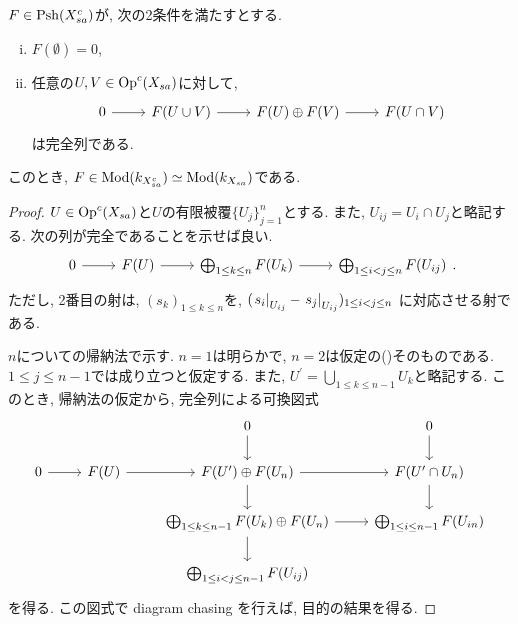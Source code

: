 \documentclass[../main]{subfiles}
\begin{document}
\begin{prop}
  $F\in\mathrm{Psh}(X_{sa}^c)$が, 次の2条件を満たすとする.
  \begin{enumerate}[(i)]
    \item $F(\emptyset)=0$,
    \item 任意の$U,V\in\mathrm{Op}^c(X_{sa})$に対して,
      \[
        \begin{tikzcd}
          0 \ar[r]
          & F(U \cup V) \ar[r]
          & F(U) \oplus F(V) \ar[r]
          & F(U \cap V)
        \end{tikzcd}
      \]
      は完全列である.
  \end{enumerate}
  このとき,
  $F\in\mathrm{Mod}(k_{X_{sa}^c})\simeq\mathrm{Mod}(k_{X_{sa}})$である.
\end{prop}
\begin{proof}
  $U\in\mathrm{Op}^c(X_{sa})$と$U$の有限被覆$\{U_j\}_{j=1}^{n}$とする.
  また, $U_{ij} = U_i \cap U_j$と略記する.
  次の列が完全であることを示せば良い.
  \[
    \begin{tikzcd}
      0 \ar[r]
      & F(U) \ar[r]
      & \bigoplus_{1 \leq k \leq n} F(U_k) \ar[r]
      & \bigoplus_{1 \leq i < j \leq n} F(U_{ij})
    \end{tikzcd}.
  \]
  ただし, 2番目の射は,
  $(s_k)_{1 \leq k \leq n}$を,
  $(\left.s_i\right|_{U_{ij}}-\left.s_j\right|_{U_{ij}})_{1 \leq i < j \leq n}$
  に対応させる射である.

  $n$についての帰納法で示す.
  $n=1$は明らかで, $n=2$は仮定の()そのものである.
  $1 \leq j \leq n-1$では成り立つと仮定する.
  また, $U^\prime = \bigcup_{1\leq k \leq n-1} U_k$と略記する.
  このとき, 帰納法の仮定から, 完全列による可換図式
  \[
    \begin{tikzcd}
      && 0 \ar[d] & 0 \ar[d]
      \\
      0 \ar[r]
      & F(U) \ar[r]
      & F(U^\prime) \oplus F(U_n) \ar[r] \ar[d]
      & F(U^\prime\cap U_n) \ar[d]
      \\
      &
      & \bigoplus_{1 \leq k \leq n-1} F(U_k) \oplus F(U_n) \ar[r] \ar[d]
      & \bigoplus_{1 \leq i \leq n-1} F(U_{in})
      \\
      &
      & \bigoplus_{1 \leq i < j \leq n-1} F(U_{ij})
      &
    \end{tikzcd}
  \]
  を得る.
  この図式で diagram chasing を行えば, 目的の結果を得る.
\end{proof}
\end{document}
